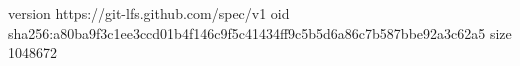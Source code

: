 version https://git-lfs.github.com/spec/v1
oid sha256:a80ba9f3c1ee3ccd01b4f146c9f5c41434ff9c5b5d6a86c7b587bbe92a3c62a5
size 1048672
